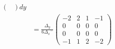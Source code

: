 \documentclass{mc2013}
\newcommand\bs{\boldsymbol}
\newcommand\tf{\varphi}
\renewcommand{\(}{\left(}
\renewcommand{\)}{\right)}
\renewcommand{\[}{\left[}
\renewcommand{\]}{\right]}
\begin{document}
\begin{itemize}
\begin{equation}
\begin{split}
\begin{pmatrix}
\end{pmatrix}
dy\\
&= \frac{{\Delta _y}}{6{\Delta _x}^-}
\begin{pmatrix}
-2 & 2 & 1 & -1 \\
0 & 0 & 0 & 0 \\
0 & 0 & 0 & 0 \\
-1 & 1 & 2 & -2
\end{pmatrix}
\end{split}
\end{equation}
%

\end{itemize}
\end{document}
